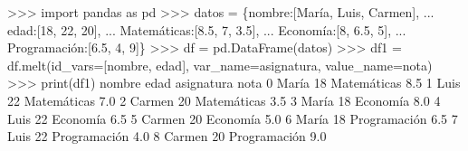 \documentclass[
  spanish,
  a4paper,
]{scrreport}
\newenvironment{Shaded}{\begin{snugshade}}{\end{snugshade}}
\newcommand{\BuiltInTok}[1]{\textcolor[rgb]{0.00,0.23,0.31}{#1}}
\newcommand{\DecValTok}[1]{\textcolor[rgb]{0.68,0.00,0.00}{#1}}
\newcommand{\FloatTok}[1]{\textcolor[rgb]{0.68,0.00,0.00}{#1}}
\newcommand{\ImportTok}[1]{\textcolor[rgb]{0.00,0.46,0.62}{#1}}
\newcommand{\NormalTok}[1]{\textcolor[rgb]{0.00,0.23,0.31}{#1}}
\newcommand{\OperatorTok}[1]{\textcolor[rgb]{0.37,0.37,0.37}{#1}}
\newcommand{\StringTok}[1]{\textcolor[rgb]{0.13,0.47,0.30}{#1}}
\begin{document}
\begin{Shaded}
\begin{Highlighting}[]
\OperatorTok{\textgreater{}\textgreater{}\textgreater{}} \ImportTok{import}\NormalTok{ pandas }\ImportTok{as}\NormalTok{ pd}
\OperatorTok{\textgreater{}\textgreater{}\textgreater{}}\NormalTok{ datos }\OperatorTok{=}\NormalTok{ \{}\StringTok{\textquotesingle{}nombre\textquotesingle{}}\NormalTok{:[}\StringTok{\textquotesingle{}María\textquotesingle{}}\NormalTok{, }\StringTok{\textquotesingle{}Luis\textquotesingle{}}\NormalTok{, }\StringTok{\textquotesingle{}Carmen\textquotesingle{}}\NormalTok{],}
\NormalTok{... }\StringTok{\textquotesingle{}edad\textquotesingle{}}\NormalTok{:[}\DecValTok{18}\NormalTok{, }\DecValTok{22}\NormalTok{, }\DecValTok{20}\NormalTok{],}
\NormalTok{... }\StringTok{\textquotesingle{}Matemáticas\textquotesingle{}}\NormalTok{:[}\FloatTok{8.5}\NormalTok{, }\DecValTok{7}\NormalTok{, }\FloatTok{3.5}\NormalTok{],}
\NormalTok{... }\StringTok{\textquotesingle{}Economía\textquotesingle{}}\NormalTok{:[}\DecValTok{8}\NormalTok{, }\FloatTok{6.5}\NormalTok{, }\DecValTok{5}\NormalTok{],}
\NormalTok{... }\StringTok{\textquotesingle{}Programación\textquotesingle{}}\NormalTok{:[}\FloatTok{6.5}\NormalTok{, }\DecValTok{4}\NormalTok{, }\DecValTok{9}\NormalTok{]\}}
\OperatorTok{\textgreater{}\textgreater{}\textgreater{}}\NormalTok{ df }\OperatorTok{=}\NormalTok{ pd.DataFrame(datos)}
\OperatorTok{\textgreater{}\textgreater{}\textgreater{}}\NormalTok{ df1 }\OperatorTok{=}\NormalTok{ df.melt(id\_vars}\OperatorTok{=}\NormalTok{[}\StringTok{\textquotesingle{}nombre\textquotesingle{}}\NormalTok{, }\StringTok{\textquotesingle{}edad\textquotesingle{}}\NormalTok{], var\_name}\OperatorTok{=}\StringTok{\textquotesingle{}asignatura\textquotesingle{}}\NormalTok{, value\_name}\OperatorTok{=}\StringTok{\textquotesingle{}nota\textquotesingle{}}\NormalTok{)}
\OperatorTok{\textgreater{}\textgreater{}\textgreater{}} \BuiltInTok{print}\NormalTok{(df1)}
\NormalTok{   nombre  edad    asignatura  nota}
\DecValTok{0}\NormalTok{   María    }\DecValTok{18}\NormalTok{   Matemáticas   }\FloatTok{8.5}
\DecValTok{1}\NormalTok{    Luis    }\DecValTok{22}\NormalTok{   Matemáticas   }\FloatTok{7.0}
\DecValTok{2}\NormalTok{  Carmen    }\DecValTok{20}\NormalTok{   Matemáticas   }\FloatTok{3.5}
\DecValTok{3}\NormalTok{   María    }\DecValTok{18}\NormalTok{      Economía   }\FloatTok{8.0}
\DecValTok{4}\NormalTok{    Luis    }\DecValTok{22}\NormalTok{      Economía   }\FloatTok{6.5}
\DecValTok{5}\NormalTok{  Carmen    }\DecValTok{20}\NormalTok{      Economía   }\FloatTok{5.0}
\DecValTok{6}\NormalTok{   María    }\DecValTok{18}\NormalTok{  Programación   }\FloatTok{6.5}
\DecValTok{7}\NormalTok{    Luis    }\DecValTok{22}\NormalTok{  Programación   }\FloatTok{4.0}
\DecValTok{8}\NormalTok{  Carmen    }\DecValTok{20}\NormalTok{  Programación   }\FloatTok{9.0}
\end{Highlighting}
\end{Shaded}
\end{document}
